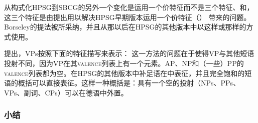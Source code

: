 从构式化HPSG到SBCG的另外一个变化是运用一个价特征而不是三个特征\sprc、\subjc 和\compsc，这三个特征是由\citet{Borsley87}提出用以解决HPSG早期版本运用一个价特征（\subcatc） 带来的问题。Borseley的提法被\citet[\S~9]{ps2}所采纳，并且从那以后在HPSG的其他版本中以这样或那样的方式使用。

\citet[]{Sag2012a}提出，VPs按照下面的特征描写来表示：
\ea
{}
\z
这一方法的问题在于使得VP与其他短语投射不同，因为VP在其\textsc{valence}列表上有一个元素。AP、NP和（一些）PP的\textsc{valence}列表都为空。在HPSG的其他版本中补足语在\compslc 中表征，并且\compslc 完全饱和的短语的概括可以直接表征。这样一种概括是：具有一个空\compslc 的投射（NPs、PPs、VPs、副词、CPs）可以在德语中外置\citep[\S~13.1.2]{Mueller99a}。

\subsubsection{小结}

